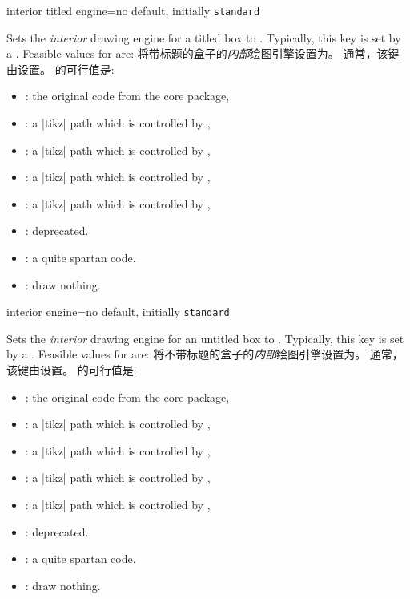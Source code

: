 \begin{docTcbKey}{interior titled engine}{=}{no default, initially \texttt{standard}}
\begin{stripedbox}
Sets the \emph{interior} drawing engine for a titled box to .
Typically, this key is set by a .
Feasible values for  are:
\tcblower
将带标题的盒子的\emph{内部}绘图引擎设置为。%
通常，该键由设置。
的可行值是:
\end{stripedbox}  

  \begin{itemize}
  \item{}: the original code from the core package,
  \item{}: a |tikz| path which is controlled by ,
  \item{}: a |tikz| path which is controlled by ,
  \item{}: a |tikz| path which is controlled by ,
  \item{}: a |tikz| path which is controlled by ,
  \item{}: deprecated.
  \item{}: a quite spartan code.
  \item{}: draw nothing.
  \end{itemize}
\end{docTcbKey}

\begin{docTcbKey}{interior engine}{=}{no default, initially \texttt{standard}}
\begin{stripedbox}
Sets the \emph{interior} drawing engine for an untitled box to .
Typically, this key is set by a .
Feasible values for  are:
\tcblower
将不带标题的盒子的\emph{内部}绘图引擎设置为。
通常，该键由设置。
的可行值是:
    \end{stripedbox}
  \begin{itemize}
  \item{}: the original code from the core package,
  \item{}: a |tikz| path which is controlled by ,
  \item{}: a |tikz| path which is controlled by ,
  \item{}: a |tikz| path which is controlled by ,
  \item{}: a |tikz| path which is controlled by ,
  \item{}: deprecated.
  \item{}: a quite spartan code.
  \item{}: draw nothing.
  \end{itemize}
\end{docTcbKey}

